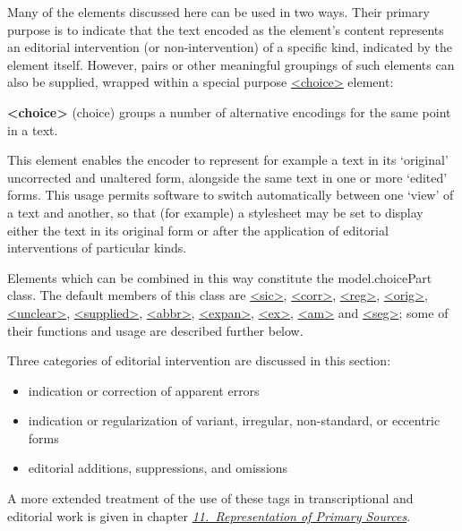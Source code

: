 \par
Many of the elements discussed here can be used in two ways. Their primary purpose is to indicate that the text encoded as the element's content represents an editorial intervention (or non-intervention) of a specific kind, indicated by the element itself. However, pairs or other meaningful groupings of such elements can also be supplied, wrapped within a special purpose \hyperref[TEI.choice]{<choice>} element: 
\begin{sansreflist}
  
\item [\textbf{<choice>}] (choice) groups a number of alternative encodings for the same point in a text.
\end{sansreflist}
 This element enables the encoder to represent for example a text in its ‘original’ uncorrected and unaltered form, alongside the same text in one or more ‘edited’ forms. This usage permits software to switch automatically between one ‘view’ of a text and another, so that (for example) a stylesheet may be set to display either the text in its original form or after the application of editorial interventions of particular kinds.\par
Elements which can be combined in this way constitute the \textsf{model.choicePart} class. The default members of this class are \hyperref[TEI.sic]{<sic>}, \hyperref[TEI.corr]{<corr>}, \hyperref[TEI.reg]{<reg>}, \hyperref[TEI.orig]{<orig>}, \hyperref[TEI.unclear]{<unclear>}, \hyperref[TEI.supplied]{<supplied>}, \hyperref[TEI.abbr]{<abbr>}, \hyperref[TEI.expan]{<expan>}, \hyperref[TEI.ex]{<ex>}, \hyperref[TEI.am]{<am>} and \hyperref[TEI.seg]{<seg>}; some of their functions and usage are described further below.\par
Three categories of editorial intervention are discussed in this section: \begin{itemize}
\item indication or correction of apparent errors 
\item indication or regularization of variant, irregular, non-standard, or eccentric forms
\item editorial additions, suppressions, and omissions
\end{itemize} \par
A more extended treatment of the use of these tags in transcriptional and editorial work is given in chapter \textit{\hyperref[PH]{11.\ Representation of Primary Sources}}.
